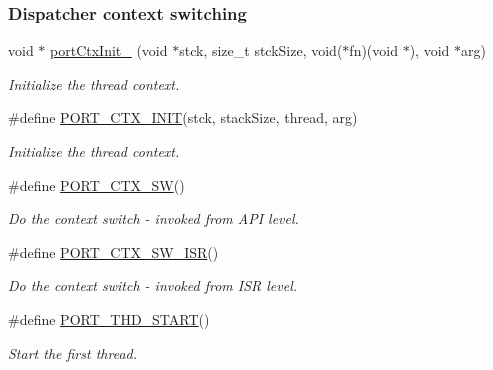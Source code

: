 \subsubsection*{Dispatcher context switching}
\begin{DoxyCompactItemize}
\item 
void $\ast$ \hyperlink{group__template__cpu__intf_ga91a1dc500f743c80ec573148a99add67}{port\-Ctx\-Init\-\_\-} (void $\ast$stck, size\-\_\-t stck\-Size, void($\ast$fn)(void $\ast$), void $\ast$arg)
\begin{DoxyCompactList}\small\item\em Initialize the thread context. \end{DoxyCompactList}\item 
\#define \hyperlink{group__template__cpu__intf_ga80d15a56d61c9d4e786e52006ff4ac43}{P\-O\-R\-T\-\_\-\-C\-T\-X\-\_\-\-I\-N\-I\-T}(stck, stack\-Size, thread, arg)
\begin{DoxyCompactList}\small\item\em Initialize the thread context. \end{DoxyCompactList}\item 
\#define \hyperlink{group__template__cpu__intf_ga50a3b72a7f2065922811f0d6dedda01a}{P\-O\-R\-T\-\_\-\-C\-T\-X\-\_\-\-S\-W}()
\begin{DoxyCompactList}\small\item\em Do the context switch -\/ invoked from A\-P\-I level. \end{DoxyCompactList}\item 
\#define \hyperlink{group__template__cpu__intf_ga20bba8f9c5a2f38fd7c63b9d2320e511}{P\-O\-R\-T\-\_\-\-C\-T\-X\-\_\-\-S\-W\-\_\-\-I\-S\-R}()
\begin{DoxyCompactList}\small\item\em Do the context switch -\/ invoked from I\-S\-R level. \end{DoxyCompactList}\item 
\#define \hyperlink{group__template__cpu__intf_ga07b918aaaed3cd0dbe89eb780ce3cb36}{P\-O\-R\-T\-\_\-\-T\-H\-D\-\_\-\-S\-T\-A\-R\-T}()
\begin{DoxyCompactList}\small\item\em Start the first thread. \end{DoxyCompactList}\end{DoxyCompactItemize}
